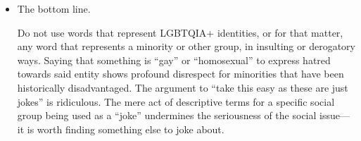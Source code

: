 \documentclass[parskip=half-]{scrartcl}
\begin{document}
\begin{itemize}
	\item The bottom line.

		Do not use words that represent LGBTQIA+ identities, or for that matter, any word that represents a minority or other group, in insulting or derogatory ways. Saying that something is ``gay'' or ``homosexual'' to express hatred towards said entity shows profound disrespect for minorities that have been historically disadvantaged.  The argument to ``take this easy as these are just jokes'' is ridiculous. The mere act of descriptive terms for a specific social group being used as a ``joke'' undermines the seriousness of the social issue---it is worth finding something else to joke about.
\end{itemize}
\end{document}
